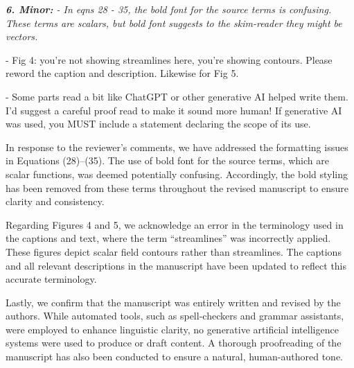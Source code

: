\documentclass[12pt]{article}
\begin{document}
\vspace{3mm}
{\it \textbf{6. Minor:}
- In eqns 28 - 35, the bold font for the source terms is confusing. These terms are scalars, but bold font suggests to the skim-reader they might be vectors.

- Fig 4: you're not showing streamlines here, you're showing contours. Please reword the caption and description. Likewise for Fig 5.

- Some parts read a bit like ChatGPT or other generative AI helped write them. I'd suggest a careful proof read to make it sound more human! If generative AI was used, you MUST include a statement declaring the scope of its use.}
\vspace{3mm}

In response to the reviewer's comments, we have addressed the formatting issues in Equations (28)--(35). The use of bold font for the source terms, which are scalar functions, was deemed potentially confusing. Accordingly, the bold styling has been removed from these terms throughout the revised manuscript to ensure clarity and consistency.

Regarding Figures 4 and 5, we acknowledge an error in the terminology used in the captions and text, where the term ``streamlines'' was incorrectly applied. These figures depict scalar field contours rather than streamlines. The captions and all relevant descriptions in the manuscript have been updated to reflect this accurate terminology.

Lastly, we confirm that the manuscript was entirely written and revised by the authors. While automated tools, such as spell-checkers and grammar assistants, were employed to enhance linguistic clarity, no generative artificial intelligence systems were used to produce or draft content. A thorough proofreading of the manuscript has also been conducted to ensure a natural, human-authored tone.

\vspace{3mm}
\end{document}
